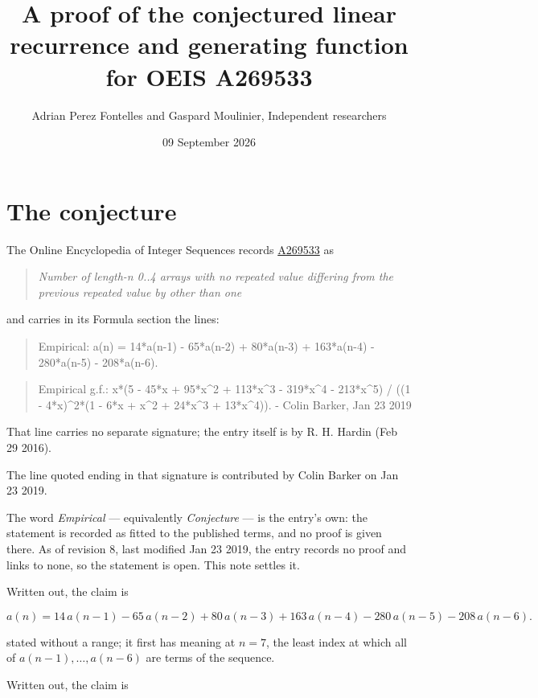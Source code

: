 \documentclass[11pt]{article}
\title{A proof of the conjectured linear recurrence and generating function for OEIS A269533}
\author{Adrian Perez Fontelles and Gaspard Moulinier, Independent researchers}
\date{09 September 2026}
\theoremstyle{definition}
\begin{document}
\maketitle
\section{The conjecture}

The Online Encyclopedia of Integer Sequences records \href{https://oeis.org/A269533}{A269533} as

\begin{quote}\itshape Number of length-n 0..4 arrays with no repeated value differing from the previous repeated value by other than one\end{quote}

and carries in its Formula section the lines:

\begin{quote}\ttfamily Empirical: a(n) = 14*a(n-1) - 65*a(n-2) + 80*a(n-3) + 163*a(n-4) - 280*a(n-5) - 208*a(n-6).\end{quote}

\begin{quote}\ttfamily Empirical g.f.: x*(5 - 45*x + 95*x\textasciicircum{}2 + 113*x\textasciicircum{}3 - 319*x\textasciicircum{}4 - 213*x\textasciicircum{}5) / ((1 - 4*x)\textasciicircum{}2*(1 - 6*x + x\textasciicircum{}2 + 24*x\textasciicircum{}3 + 13*x\textasciicircum{}4)). - Colin Barker, Jan 23 2019\end{quote}

That line carries no separate signature; the entry itself is by R. H. Hardin (Feb 29 2016).

The line quoted ending in that signature is contributed by Colin Barker on Jan 23 2019.

The word {\itshape Empirical} --- equivalently {\itshape Conjecture} --- is the entry's own: the statement is recorded as fitted to the published terms, and no proof is given there. As of revision 8, last modified Jan 23 2019, the entry records no proof and links to none, so the statement is open. This note settles it.

Written out, the claim is

\[a(n) = 14\,a(n-1) - 65\,a(n-2) + 80\,a(n-3) + 163\,a(n-4) - 280\,a(n-5) - 208\,a(n-6).\]

stated without a range; it first has meaning at $n = 7$, the least index at which all of $a(n-1),\dots,a(n-6)$ are terms of the sequence.

Written out, the claim is
\end{document}
